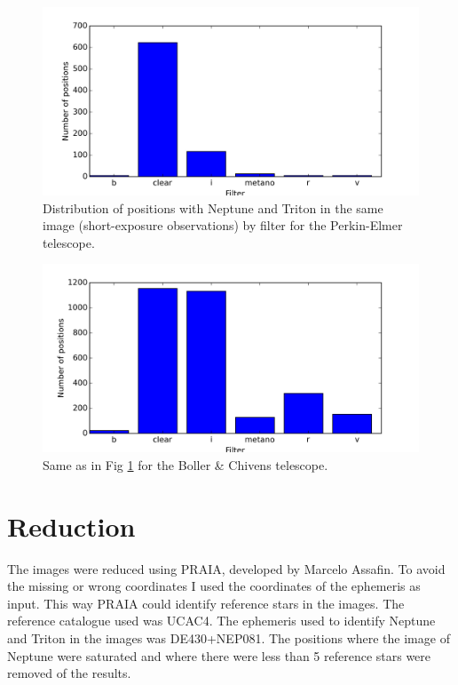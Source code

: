 \documentclass[12pt,a4paper]{report}
\newcommand{\PE}{Perkin-Elmer }
\newcommand{\BC}{Boller \& Chivens }
\begin{document}
\begin{figure}[H]
\includegraphics[width=16.0cm]{filtro_160.png} 
\caption{Distribution of positions with Neptune and Triton in the same image (short-exposure observations) by filter for the \PE telescope.}
\label{Fig:filtro-160}
\end{figure}

\begin{figure}[H]
\includegraphics[width=16.0cm]{filtro_IAG.png} 
\caption{Same as in Fig \ref{Fig:filtro-160} for the \BC telescope.}
\label{Fig:filtro-IAG}
\end{figure}



\section*{Reduction}

The images were reduced using PRAIA, developed by Marcelo Assafin. To avoid the missing or wrong coordinates I used the coordinates of the ephemeris as input. This way PRAIA could identify reference stars in the images. The reference catalogue used was UCAC4. The ephemeris used to identify Neptune and Triton in the images was DE430+NEP081. The positions where the image of Neptune were saturated and where there were less than 5 reference stars were removed of the results.
\end{document}
